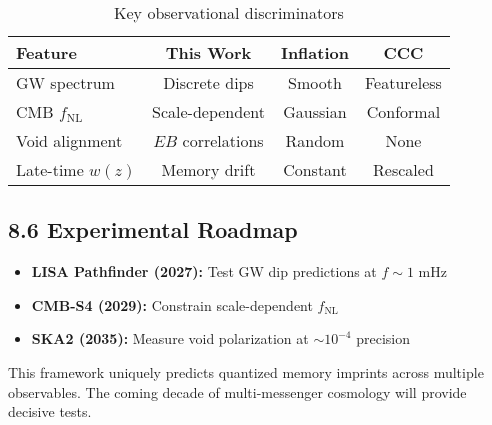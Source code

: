 \begin{table}[h]
\centering
\begin{tabular}{|l|c|c|c|}
\hline
\textbf{Feature} & \textbf{This Work} & \textbf{Inflation} & \textbf{CCC} \\
\hline
GW spectrum & Discrete dips & Smooth & Featureless \\
CMB $f_{\text{NL}}$ & Scale-dependent & Gaussian & Conformal \\
Void alignment & $EB$ correlations & Random & None \\
Late-time $w(z)$ & Memory drift & Constant & Rescaled \\
\hline
\end{tabular}
\caption{Key observational discriminators}
\end{table}

\subsection*{8.6 Experimental Roadmap}

\begin{itemize}
  \item \textbf{LISA Pathfinder (2027):} Test GW dip predictions at $f \sim 1$ mHz\cite{amaroseoane2017laser}
  \item \textbf{CMB-S4 (2029):} Constrain scale-dependent $f_{\text{NL}}$\cite{cmbs42019science}
  \item \textbf{SKA2 (2035):} Measure void polarization at $\sim 10^{-4}$ precision\cite{dewdney2009ska}
\end{itemize}

This framework uniquely predicts quantized memory imprints across multiple observables. The coming decade of multi-messenger cosmology will provide decisive tests.





